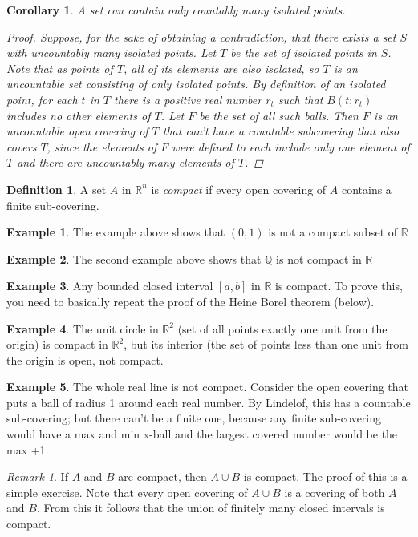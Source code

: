\documentclass[11pt,a4paper]{report}
\theoremstyle{plain}
\newtheorem*{cor}{Corollary}
\theoremstyle{definition}
\newtheorem{defn}{Definition}[section]
\newtheorem{exmp}{Example}[section]
\theoremstyle{remark}
\newtheorem*{rem}{Remark}
\begin{document}
\begin{cor}
A set can contain only countably many isolated points.
\begin{proof}
Suppose, for the sake of obtaining a contradiction, that there exists a set $S$ with uncountably many isolated points.  Let $T$ be the set of isolated points in $S$. Note that as points of $T$, all of its elements are also isolated, so $T$ is an uncountable set consisting of only isolated points. By definition of an isolated point, for each $t$ in $T$ there is a positive real number $r_t$ such that $B(t;r_t)$ includes no other elements of $T$. Let $F$ be the set of all such balls.  Then $F$ is an uncountable open covering of $T$ that can't have a countable subcovering that also covers $T$, since the elements of $F$ were defined to each include only one element of $T$ and there are uncountably many elements of $T$.
\end{proof}
\end{cor}
\begin{defn}
A set $A$ in $\mathbb{R}^n$ is \textit{compact} if every open covering of $A$ contains a finite sub-covering.
\end{defn}
\begin{exmp}
The example above shows that $(0,1)$ is not a compact subset of $\mathbb{R}$
\end{exmp}
\begin{exmp}
The second example above shows that $\mathbb{Q}$ is not compact in $\mathbb{R}$
\end{exmp}
\begin{exmp}
Any bounded closed interval $[a,b]$ in $\mathbb{R}$ is compact.  To prove this, you need to basically repeat the proof of the Heine Borel theorem (below).
\end{exmp}
\begin{exmp}
The unit circle in $\mathbb{R}^2$ (set of all points exactly one unit from the origin) is compact in $\mathbb{R}^2$, but its interior (the set of points less than one unit from the origin is open, not compact.
\end{exmp}
\begin{exmp}
The whole real line is not compact.  Consider the open covering that puts a ball of radius 1 around each real number.  By Lindelof, this has a countable sub-covering; but there can't be a finite one, because any finite sub-covering would have a max and min x-ball and the largest covered number would be the max +1.
\end{exmp}
\begin{rem}
If $A$ and $B$ are compact, then $A \cup B$ is compact.  The proof of this is a simple exercise.  Note that every open covering of $A \cup B$ is a covering of both $A$ and $B$.  From this it follows that the union of finitely many closed intervals is compact.
\end{rem}
\end{document}
